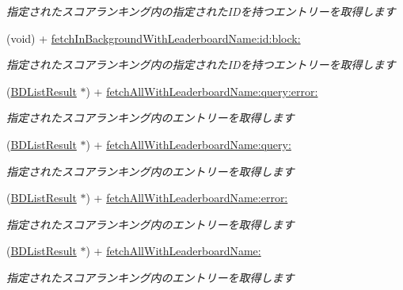 \begin{DoxyCompactItemize}
\begin{DoxyCompactList}\small\item\em 指定されたスコアランキング内の指定された\-I\-Dを持つエントリーを取得します \end{DoxyCompactList}\item 
(void) + \hyperlink{interface_b_d_leaderboard_entry_a53b6a64fee6fdd893e9e97922c2fb414}{fetch\-In\-Background\-With\-Leaderboard\-Name\-:id\-:block\-:}
\begin{DoxyCompactList}\small\item\em 指定されたスコアランキング内の指定された\-I\-Dを持つエントリーを取得します \end{DoxyCompactList}\item 
(\hyperlink{interface_b_d_list_result}{B\-D\-List\-Result} $\ast$) + \hyperlink{interface_b_d_leaderboard_entry_a8ca7ad75ca1c854c72f590c6ac6ecb84}{fetch\-All\-With\-Leaderboard\-Name\-:query\-:error\-:}
\begin{DoxyCompactList}\small\item\em 指定されたスコアランキング内のエントリーを取得します \end{DoxyCompactList}\item 
(\hyperlink{interface_b_d_list_result}{B\-D\-List\-Result} $\ast$) + \hyperlink{interface_b_d_leaderboard_entry_a40e2d8c5296dccb2429ef9bce6e5743d}{fetch\-All\-With\-Leaderboard\-Name\-:query\-:}
\begin{DoxyCompactList}\small\item\em 指定されたスコアランキング内のエントリーを取得します \end{DoxyCompactList}\item 
(\hyperlink{interface_b_d_list_result}{B\-D\-List\-Result} $\ast$) + \hyperlink{interface_b_d_leaderboard_entry_ad5c32a73ba9c77f2ac84241ecf9a2f5f}{fetch\-All\-With\-Leaderboard\-Name\-:error\-:}
\begin{DoxyCompactList}\small\item\em 指定されたスコアランキング内のエントリーを取得します \end{DoxyCompactList}\item 
(\hyperlink{interface_b_d_list_result}{B\-D\-List\-Result} $\ast$) + \hyperlink{interface_b_d_leaderboard_entry_a657617e05879fb5e6dccf061854cd4d8}{fetch\-All\-With\-Leaderboard\-Name\-:}
\begin{DoxyCompactList}\small\item\em 指定されたスコアランキング内のエントリーを取得します \end{DoxyCompactList}\item 

\end{DoxyCompactItemize}
